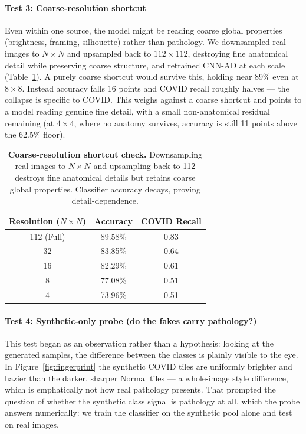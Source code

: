\documentclass[11pt]{article}
\begin{document}
\paragraph{Test 3: Coarse-resolution shortcut}
Even within one source, the model might be reading coarse global properties (brightness, framing, silhouette) rather than pathology. We downsampled real images to $N \times N$ and upsampled back to $112 \times 112$, destroying fine anatomical detail while preserving coarse structure, and retrained CNN-AD at each scale (Table~\ref{tab:coarse_resolution}). A purely coarse shortcut would survive this, holding near 89\% even at $8 \times 8$. Instead accuracy falls 16 points and COVID recall roughly halves --- the collapse is specific to COVID. This weighs against a coarse shortcut and points to a model reading genuine fine detail, with a small non-anatomical residual remaining (at $4 \times 4$, where no anatomy survives, accuracy is still 11 points above the 62.5\% floor).

\begin{table}[htbp]
\centering
\caption{\textbf{Coarse-resolution shortcut check.} Downsampling real images to $N \times N$ and upsampling back to 112 destroys fine anatomical details but retains coarse global properties. Classifier accuracy decays, proving detail-dependence.}
\label{tab:coarse_resolution}
\begin{tabular}{@{}ccc@{}}
\toprule
\textbf{Resolution ($N \times N$)} & \textbf{Accuracy} & \textbf{COVID Recall} \\
\midrule
112 (Full) & 89.58\% & 0.83 \\
32 & 83.85\% & 0.64 \\
16 & 82.29\% & 0.61 \\
8 & 77.08\% & 0.51 \\
4 & 73.96\% & 0.51 \\
\bottomrule
\end{tabular}
\end{table}

\paragraph{Test 4: Synthetic-only probe (do the fakes carry pathology?)}
This test began as an observation rather than a hypothesis: looking at the generated samples, the difference between the classes is plainly visible to the eye. In Figure~\ref{fig:fingerprint} the synthetic COVID tiles are uniformly brighter and hazier than the darker, sharper Normal tiles --- a whole-image style difference, which is emphatically not how real pathology presents. That prompted the question of whether the synthetic class signal is pathology at all, which the probe answers numerically: we train the classifier on the synthetic pool alone and test on real images.
\end{document}
